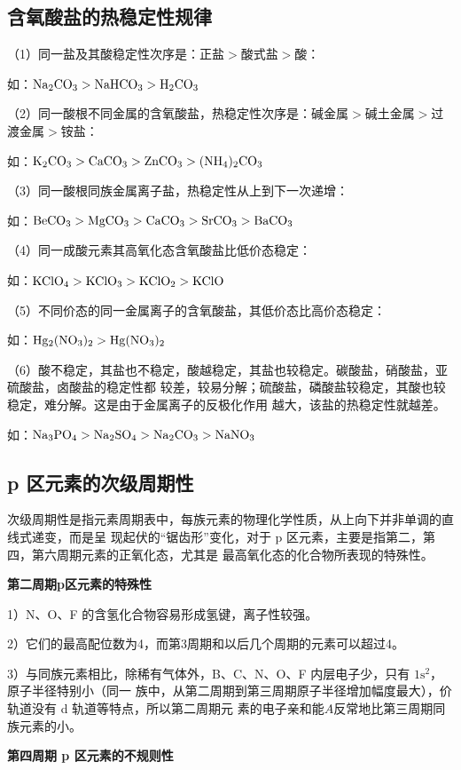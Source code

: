 \documentclass[
  10pt,
  twoside,
  openany,
  b5paper, %
  colorscheme = basic, %
  xits = false,
]{qyxf-book}
\begin{document}
\subsection{含氧酸盐的热稳定性规律}

（1）同一盐及其酸稳定性次序是：正盐$>$酸式盐$>$酸：

如：$\ce{Na2CO3}>\ce{NaHCO3}>\ce{H2CO3}$

（2）同一酸根不同金属的含氧酸盐，热稳定性次序是：碱金属$>$碱土金属$>$过渡金属$>$铵盐：

如：$\ce{K2CO3}>\ce{CaCO3}>\ce{ZnCO3}>\ce{(NH4)2CO3}$

（3）同一酸根同族金属离子盐，热稳定性从上到下一次递增：

如：$\ce{BeCO3}>\ce{MgCO3}>\ce{CaCO3}>\ce{SrCO3}>\ce{BaCO3}$

（4）同一成酸元素其高氧化态含氧酸盐比低价态稳定：

如：$\ce{KClO4}>\ce{KClO3}>\ce{KClO2}>\ce{KClO}$

（5）不同价态的同一金属离子的含氧酸盐，其低价态比高价态稳定：

如：$\ce{Hg2(NO3)2}>\ce{Hg(NO3)2}$

（6）酸不稳定，其盐也不稳定，酸越稳定，其盐也较稳定。碳酸盐，硝酸盐，亚硫酸盐，卤酸盐的稳定性都
较差，较易分解；硫酸盐，磷酸盐较稳定，其酸也较稳定，难分解。这是由于金属离子的反极化作用
越大，该盐的热稳定性就越差。

如：$ \ce{Na3PO4}>\ce{Na2SO4}>\ce{Na2CO3}>\ce{NaNO3}$


\subsection{p 区元素的次级周期性}

次级周期性是指元素周期表中，每族元素的物理化学性质，从上向下并非单调的直线式递变，而是呈
现起伏的“锯齿形”变化，对于 p 区元素，主要是指第二，第四，第六周期元素的正氧化态，尤其是
最高氧化态的化合物所表现的特殊性。
	
\textbf{第二周期p区元素的特殊性}

1）N、O、F 的含氢化合物容易形成氢键，离子性较强。

2）它们的最高配位数为4，而第3周期和以后几个周期的元素可以超过4。

3）与同族元素相比，除稀有气体外，B、C、N、O、F 内层电子少，只有 $\mathrm{1s^2}$，原子半径特别小（同一
族中，从第二周期到第三周期原子半径增加幅度最大），价轨道没有 d 轨道等特点，所以第二周期元
素的电子亲和能$A$反常地比第三周期同族元素的小。

\textbf{第四周期 p 区元素的不规则性}
\end{document}
